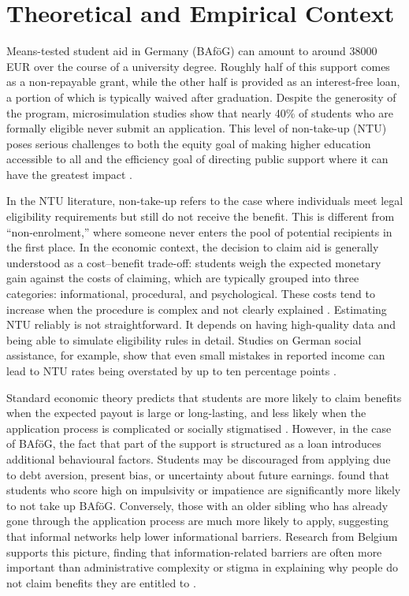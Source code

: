 \section{Theoretical and Empirical Context}
\label{section:theoretical_empirical_context}

Means-tested student aid in Germany (BAföG) can amount to around 38000 EUR over the course of a university degree. Roughly half of this support comes as a non-repayable grant, while the other half is provided as an interest-free loan, a portion of which is typically waived after graduation. Despite the generosity of the program, microsimulation studies show that nearly 40\% of students who are formally eligible never submit an application. This level of non-take-up (NTU) poses serious challenges to both the equity goal of making higher education accessible to all and the efficiency goal of directing public support where it can have the greatest impact \citep{herber_non-take-up_2019}.

In the NTU literature, non-take-up refers to the case where individuals meet legal eligibility requirements but still do not receive the benefit. 
This is different from “non-enrolment,” where someone never enters the pool of potential recipients in the first place. 
In the economic context, the decision to claim aid is generally understood as a cost–benefit trade-off: students weigh the expected monetary gain against the costs of claiming, which are typically grouped into three categories: informational, procedural, and psychological. 
These costs tend to increase when the procedure is complex and not clearly explained \citep{booij_role_2012}. Estimating NTU reliably is not straightforward. It depends on having high-quality data and being able to simulate eligibility rules in detail. Studies on German social assistance, for example, show that even small mistakes in reported income can lead to NTU rates being overstated by up to ten percentage points \citep{frick_claim_2007}.

Standard economic theory predicts that students are more likely to claim benefits when the expected payout is large or long-lasting, and less likely when the application process is complicated or socially stigmatised \citep{booij_role_2012}. However, in the case of BAföG, the fact that part of the support is structured as a loan introduces additional behavioural factors. Students may be discouraged from applying due to debt aversion, present bias, or uncertainty about future earnings. \cite{herber_non-take-up_2019} found that students who score high on impulsivity or impatience are significantly more likely to not take up BAföG. Conversely, those with an older sibling who has already gone through the application process are much more likely to apply, suggesting that informal networks help lower informational barriers. Research from Belgium supports this picture, finding that information-related barriers are often more important than administrative complexity or stigma in explaining why people do not claim benefits they are entitled to \citep{fidan_why_2021, herber_non-take-up_2019, bolland_information_nodate}.

